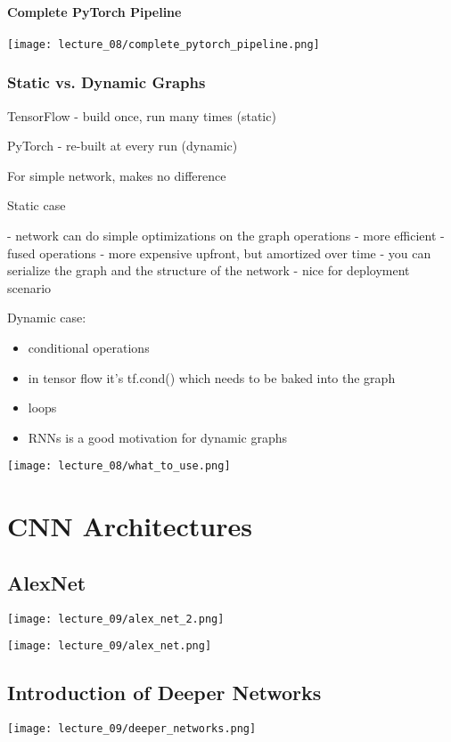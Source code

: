 \paragraph{Complete PyTorch Pipeline}

\texttt{[image: lecture\_08/complete\_pytorch\_pipeline.png]}

\subsubsection{Static vs. Dynamic Graphs}

TensorFlow - build once, run many times (static)

PyTorch - re-built at every run (dynamic)

For simple network, makes no difference

Static case

- network can do simple optimizations on the graph operations
  - more efficient - fused operations
  - more expensive upfront, but amortized over time
- you can serialize the graph and the structure of the network
  - nice for deployment scenario

Dynamic case:
\begin{itemize}
\item conditional operations
\item in tensor flow it's tf.cond() which needs to be baked into the graph
\item loops
\item RNNs is a good motivation for dynamic graphs
\end{itemize}

\texttt{[image: lecture\_08/what\_to\_use.png]}

\section{CNN Architectures}
\subsection{AlexNet}

\texttt{[image: lecture\_09/alex\_net\_2.png]}

\texttt{[image: lecture\_09/alex\_net.png]}

\subsection{Introduction of Deeper Networks}
\texttt{[image: lecture\_09/deeper\_networks.png]}

